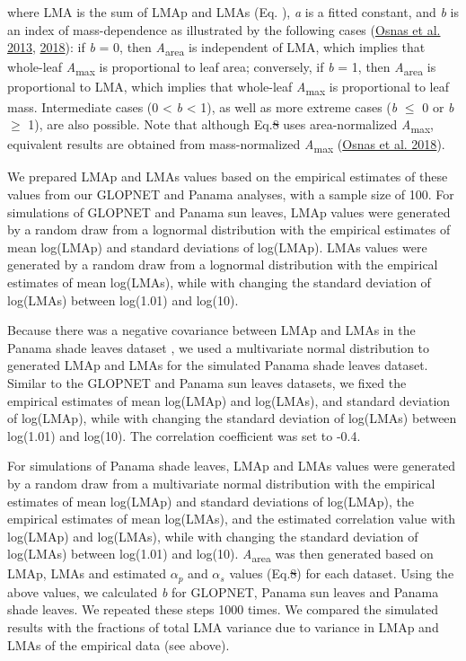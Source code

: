 \documentclass[
  12pt,
  a4paper,
,tablecaptionabove
]{scrartcl}
\providecommand{\DIFaddtex}[1]{{\protect\color{blue}\uwave{#1}}} %
\providecommand{\DIFdeltex}[1]{{\protect\color{red}\sout{#1}}}                      %
\providecommand{\DIFaddbegin}{} %
\providecommand{\DIFaddend}{} %
\providecommand{\DIFdelbegin}{} %
\providecommand{\DIFdelend}{} %
\providecommand{\DIFadd}[1]{\texorpdfstring{\DIFaddtex{#1}}{#1}} %
\providecommand{\DIFdel}[1]{\texorpdfstring{\DIFdeltex{#1}}{}} %
\newcommand{\DIFscaledelfig}{0.5}
\newlength{\DIFdelgraphicswidth} %
\newlength{\DIFdelgraphicsheight} %
\newcommand{\DIFaddincludegraphics}[2][]{{\color{blue}\fbox{\DIFOincludegraphics[#1]{#2}}}} %
\newcommand{\DIFdelincludegraphics}[2][]{%
\sbox{\DIFdelgraphicsbox}{\DIFOincludegraphics[#1]{#2}}%
\settoboxwidth{\DIFdelgraphicswidth}{\DIFdelgraphicsbox} %
\settoboxtotalheight{\DIFdelgraphicsheight}{\DIFdelgraphicsbox} %
\scalebox{\DIFscaledelfig}{%
\parbox[b]{\DIFdelgraphicswidth}{\usebox{\DIFdelgraphicsbox}\\[-\baselineskip] \rule{\DIFdelgraphicswidth}{0em}}\llap{\resizebox{\DIFdelgraphicswidth}{\DIFdelgraphicsheight}{%
\setlength{\unitlength}{\DIFdelgraphicswidth}%
\begin{picture}(1,1)%
\thicklines\linethickness{2pt} %
{\color[rgb]{1,0,0}\put(0,0){\framebox(1,1){}}}%
{\color[rgb]{1,0,0}\put(0,0){\line( 1,1){1}}}%
{\color[rgb]{1,0,0}\put(0,1){\line(1,-1){1}}}%
\end{picture}%
}\hspace*{3pt}}} %
} %
\DeclareRobustCommand{\DIFaddbegin}{\DIFOaddbegin \let\includegraphics\DIFaddincludegraphics} %
\DeclareRobustCommand{\DIFaddend}{\DIFOaddend \let\includegraphics\DIFOincludegraphics} %
\DeclareRobustCommand{\DIFdelbegin}{\DIFOdelbegin \let\includegraphics\DIFdelincludegraphics} %
\DeclareRobustCommand{\DIFdelend}{\DIFOaddend \let\includegraphics\DIFOincludegraphics} %
\begin{document}
where LMA is the sum of LMAp and LMAs (Eq.\DIFdelbegin %
\DIFdelend \DIFaddbegin \DIFadd{~\ref{eq-LMA}}\DIFaddend ), \emph{a} is a
fitted constant, and \emph{b} is an index of mass-dependence as
illustrated by the following cases
(\protect\hyperlink{ref-Osnas2013}{Osnas et al. 2013},
\protect\hyperlink{ref-Osnas2018}{2018}): if \emph{b} = 0, then
\emph{A}\textsubscript{area} is independent of LMA, which implies that
whole-leaf \emph{A}\textsubscript{max} is proportional to leaf area;
conversely, if \emph{b} = 1, then \emph{A}\textsubscript{area} is
proportional to LMA, which implies that whole-leaf
\emph{A}\textsubscript{max} is proportional to leaf mass. Intermediate
cases (0 \textless{} \emph{b} \textless{} 1), as well as more extreme
cases (\emph{b} \(\leq\) 0 or \emph{b} \(\geq\) 1), are also possible.
Note that although Eq.\DIFdelbegin \DIFdel{8 }\DIFdelend \DIFaddbegin \DIFadd{~\ref{eq-mass} }\DIFaddend uses area-normalized
\emph{A}\textsubscript{max}, equivalent results are obtained from
mass-normalized \emph{A}\textsubscript{max}
(\protect\hyperlink{ref-Osnas2018}{Osnas et al. 2018}).

We prepared LMAp and LMAs values based on the empirical estimates of
these values from our GLOPNET and Panama analyses, with a sample size of
100. For simulations of GLOPNET and Panama sun leaves, LMAp values were
generated by a random draw from a lognormal distribution with the
empirical estimates of mean log(LMAp) and standard deviations of
log(LMAp). LMAs values were generated by a random draw from a lognormal
distribution with the empirical estimates of mean log(LMAs), while with
changing the standard deviation of log(LMAs) between log(1.01) and
log(10).

Because there was a negative covariance between LMAp and LMAs in the
Panama shade leaves dataset \DIFaddbegin \DIFadd{(Fig. S\ref{fig-LMAp_LMAs})}\DIFaddend , we used a
multivariate normal distribution to generated LMAp and LMAs for the
simulated Panama shade leaves dataset. Similar to the GLOPNET and Panama
sun leaves datasets, we fixed the empirical estimates of mean log(LMAp)
and log(LMAs), and standard deviation of log(LMAp), while with changing
the standard deviation of log(LMAs) between log(1.01) and log(10). The
correlation coefficient was set to -0.4.

For simulations of Panama shade leaves, LMAp and LMAs values were
generated by a random draw from a multivariate normal distribution with
the empirical estimates of mean log(LMAp) and standard deviations of
log(LMAp), the empirical estimates of mean log(LMAs), and the estimated
correlation value with log(LMAp) and log(LMAs), while with changing the
standard deviation of log(LMAs) between log(1.01) and log(10).
\emph{A}\textsubscript{area} was then generated based on LMAp, LMAs and
estimated \(\alpha_p\) and \(\alpha_s\) values (Eq.\DIFdelbegin \DIFdel{8}\DIFdelend \DIFaddbegin \DIFadd{~\ref{eq-mass}}\DIFaddend ) for
each dataset. Using the above values, we calculated \emph{b} for
GLOPNET, Panama sun leaves and Panama shade leaves. We repeated these
steps 1000 times. We compared the simulated results with the fractions
of total LMA variance due to variance in LMAp and LMAs of the empirical
data (see above).
\end{document}
